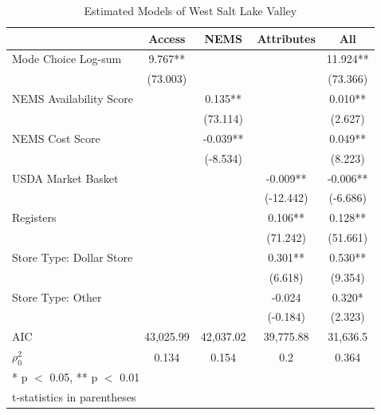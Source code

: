 \documentclass[
  letterpaper,
  DIV=11,
  numbers=noendperiod]{scrreport}
\begin{document}
\hypertarget{tbl-sl-models}{}
\begin{table}
\caption{\label{tbl-sl-models}Estimated Models of West Salt Lake Valley }\tabularnewline

\centering
\begin{tabular}[t]{lcccc}
\toprule
  & Access & NEMS & Attributes & All\\
\midrule
Mode Choice Log-sum & 9.767** &  &  & 11.924**\\
 & (73.003) &  &  & (73.366)\\
NEMS Availability Score &  & 0.135** &  & 0.010**\\
 &  & (73.114) &  & (2.627)\\
NEMS Cost Score &  & -0.039** &  & 0.049**\\
 &  & (-8.534) &  & (8.223)\\
USDA Market Basket &  &  & -0.009** & -0.006**\\
 &  &  & (-12.442) & (-6.686)\\
Registers &  &  & 0.106** & 0.128**\\
 &  &  & (71.242) & (51.661)\\
Store Type: Dollar Store &  &  & 0.301** & 0.530**\\
 &  &  & (6.618) & (9.354)\\
Store Type: Other &  &  & -0.024 & 0.320*\\
 &  &  & (-0.184) & (2.323)\\
\midrule
AIC & 43,025.99 & 42,037.02 & 39,775.88 & 31,636.5\\
$\rho^2_0$ & 0.134 & 0.154 & 0.2 & 0.364\\
\bottomrule
\multicolumn{5}{l}{\rule{0pt}{1em}* p $<$ 0.05, ** p $<$ 0.01}\\
\multicolumn{5}{l}{\rule{0pt}{1em}t-statistics in parentheses}\\
\end{tabular}
\end{table}
\end{document}

